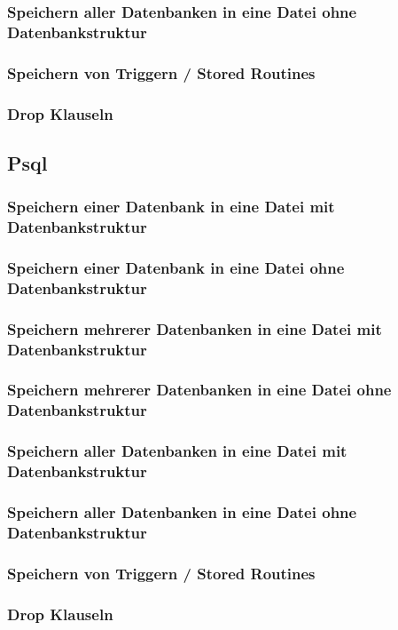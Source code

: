 \documentclass[10pt]{article}
\begin{document}
\subsubsection{Speichern aller Datenbanken in eine Datei ohne Datenbankstruktur}
\subsubsection{Speichern von Triggern / Stored Routines}
\subsubsection{Drop Klauseln}

\subsection{Psql}
\subsubsection{Speichern einer Datenbank in eine Datei mit Datenbankstruktur}
\subsubsection{Speichern einer Datenbank in eine Datei ohne Datenbankstruktur}
\subsubsection{Speichern mehrerer Datenbanken in eine Datei mit Datenbankstruktur}
\subsubsection{Speichern mehrerer Datenbanken in eine Datei ohne Datenbankstruktur}
\subsubsection{Speichern aller Datenbanken in eine Datei mit Datenbankstruktur}
\subsubsection{Speichern aller Datenbanken in eine Datei ohne Datenbankstruktur}
\subsubsection{Speichern von Triggern / Stored Routines}
\subsubsection{Drop Klauseln}
\end{document}
